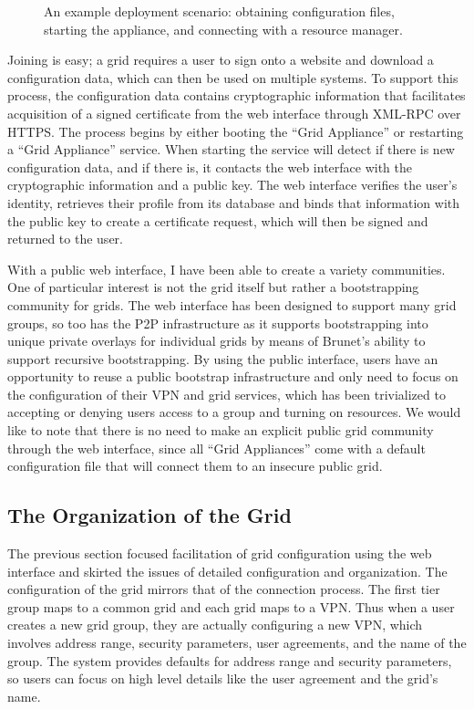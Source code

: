 \begin{figure}
\centering
{}
\caption[Grid Appliance deployment scenario]{An example deployment scenario:
obtaining configuration files, starting the appliance, and connecting with a
resource manager.}
\label{fig:system}
\end{figure}

Joining is easy; a grid requires a user to sign onto a website and download a
configuration data, which can then be used on multiple systems.  To support
this process, the configuration data contains cryptographic information that
facilitates acquisition of a signed certificate from the web interface through
XML-RPC over HTTPS.  The process begins by either booting the ``Grid
Appliance'' or restarting a ``Grid Appliance'' service.  When starting the
service will detect if there is new configuration data, and if there is, it
contacts the web interface with the cryptographic information and a public key.
The web interface verifies the user's identity, retrieves their profile from
its database and binds that information with the public key to create a
certificate request, which will then be signed and returned to the user.

With a public web interface, I have been able to create a variety communities.
One of particular interest is not the grid itself but rather a bootstrapping
community for grids.  The web interface has been designed to support many grid
groups, so too has the P2P infrastructure as it supports bootstrapping into
unique private overlays for individual grids by means of Brunet's ability to
support recursive bootstrapping.  By using the public interface, users have an
opportunity to reuse a public bootstrap infrastructure and only need to focus
on the configuration of their VPN and grid services, which has been trivialized
to accepting or denying users access to a group and turning on resources.  We
would like to note that there is no need to make an explicit public grid
community through the web interface, since all ``Grid Appliances'' come with a
default configuration file that will connect them to an insecure public grid.  

\subsection{The Organization of the Grid}

The previous section focused facilitation of grid configuration using the web
interface and skirted the issues of detailed configuration and organization.
The configuration of the grid mirrors that of the connection process.  The
first tier group maps to a common grid and each grid maps to a VPN.  Thus when
a user creates a new grid group, they are actually configuring a new VPN, which
involves address range, security parameters, user agreements, and the name of
the group.  The system provides defaults for address range and security
parameters, so users can focus on high level details like the user agreement
and the grid's name.


